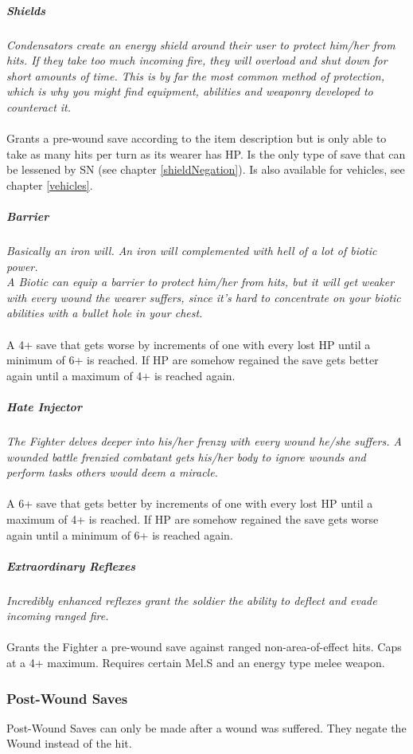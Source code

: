 \documentclass[
	11pt,
	toc=bibliography
	]{article}
\begin{document}
\subparagraph{Shields}\label{shields}
\textit{Condensators create an energy shield around their user to protect him/her from hits. If they take too much incoming fire, they will overload and shut down for short amounts of time. This is by far the most common method of protection, which is why you might find equipment, abilities and weaponry developed to counteract it.}\\\\
Grants a pre-wound save according to the item description but is only able to take as many hits per turn as its wearer has HP. Is the only type of save that can be lessened by SN (see chapter \ref{shieldNegation}). Is also available for vehicles, see chapter \ref{vehicles}.

\subparagraph{Barrier}\label{barrier}
\textit{Basically an iron will. An iron will complemented with hell of a lot of biotic power.\\
A Biotic can equip a barrier to protect him/her from hits, but it will get weaker with every wound the wearer suffers, since it’s hard to concentrate on your biotic abilities with a bullet hole in your chest.}\\\\
A 4+ save that gets worse by increments of one with every lost HP until a minimum of 6+ is reached. If HP are somehow regained the save gets better again until a maximum of 4+ is reached again.

\subparagraph{Hate Injector}\label{battleFrenzy}
\textit{The Fighter delves deeper into his/her frenzy with every wound he/she suffers. A wounded battle frenzied combatant gets his/her body to ignore wounds and perform tasks others would deem a miracle.}\\\\
A 6+ save that gets better by increments of one with every lost HP until a maximum of 4+ is reached. If HP are somehow regained the save gets worse again until a minimum of 6+ is reached again.

\subparagraph{Extraordinary Reflexes}
\textit{Incredibly enhanced reflexes grant the soldier the ability to deflect and evade incoming ranged fire.}\\\\
Grants the Fighter a pre-wound save against ranged non-area-of-effect hits. Caps at a 4+ maximum. Requires certain Mel.S and an energy type melee weapon.

\subsubsection{Post-Wound Saves}\label{postWound}
Post-Wound Saves can only be made after a wound was suffered. They negate the Wound instead of the hit.
\end{document}
